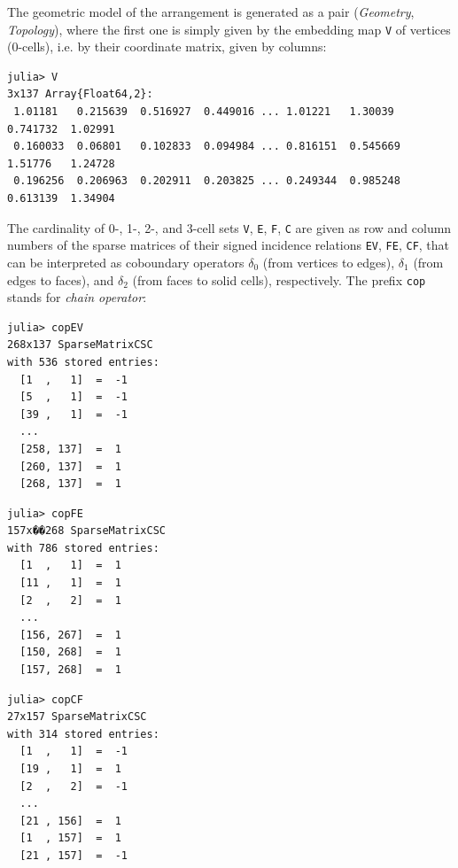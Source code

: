 \documentclass[11pt, oneside]{amsart}   	%
\begin{document}
The geometric model of the arrangement is generated as a pair (\emph{Geometry}, \emph{Topology}), where the first one is simply given by the embedding map \texttt{V} of vertices (0-cells), i.e. by their coordinate matrix, given by columns:

\vspace{1mm}
\noindent
{\small 
\begin{verbatim}
julia> V
3x137 Array{Float64,2}:
 1.01181   0.215639  0.516927  0.449016 ... 1.01221   1.30039   0.741732  1.02991
 0.160033  0.06801   0.102833  0.094984 ... 0.816151  0.545669  1.51776   1.24728
 0.196256  0.206963  0.202911  0.203825 ... 0.249344  0.985248  0.613139  1.34904
\end{verbatim}}
\vspace{1mm}

The cardinality of 0-, 1-, 2-, and 3-cell sets \texttt{V}, \texttt{E}, \texttt{F}, \texttt{C} are given as row and column numbers of the sparse matrices of their signed incidence relations \texttt{EV}, \texttt{FE}, \texttt{CF}, that can be interpreted as coboundary operators $\delta_0$ (from vertices to edges), $\delta_1$ (from edges to faces), and $\delta_2$ (from faces to solid cells), respectively. The prefix \texttt{cop} stands for \emph{chain operator}:

\vspace{3mm}
\noindent
\begin{minipage}[l]{.333\textwidth}
{\small \begin{verbatim}
julia> copEV
268x137 SparseMatrixCSC
with 536 stored entries:
  [1  ,   1]  =  -1
  [5  ,   1]  =  -1
  [39 ,   1]  =  -1
  ...
  [258, 137]  =  1
  [260, 137]  =  1
  [268, 137]  =  1
\end{verbatim}}
\end{minipage}%
\hfill
\begin{minipage}{.333\textwidth}
{\small \begin{verbatim}
julia> copFE
157x��268 SparseMatrixCSC
with 786 stored entries:
  [1  ,   1]  =  1
  [11 ,   1]  =  1
  [2  ,   2]  =  1
  ...
  [156, 267]  =  1
  [150, 268]  =  1
  [157, 268]  =  1
\end{verbatim}}
\end{minipage}%
\hfill
\begin{minipage}{.333\textwidth}
{\small \begin{verbatim}
julia> copCF
27x157 SparseMatrixCSC 
with 314 stored entries:
  [1  ,   1]  =  -1
  [19 ,   1]  =  1
  [2  ,   2]  =  -1
  ...
  [21 , 156]  =  1
  [1  , 157]  =  1
  [21 , 157]  =  -1
\end{verbatim}}
\end{minipage}%
\vspace{1mm}
\end{document}
